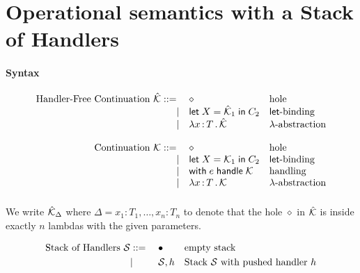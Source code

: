\documentclass{article}
\newcommand{\bnf}{\mathrel{{:}{:}{=}}}
\newcommand{\bnfor}{|}
\newcommand{\x}{x}     %
\newcommand{\C}{C}     %
\newcommand{\X}{X}     %
\newcommand{\e}{e}     %
\newcommand{\rgn}{r}   %
\newcommand{\h}{h}     %
\newcommand{\T}{T}     %
\newcommand{\letin}[1]{\mathsf{let}\; #1 \;\mathsf{in}\;} %
\newcommand{\withhandle}[1]{\mathsf{with}\;#1\;\mathsf{handle}\;} %
\newcommand{\abs}[1]{\mathsf{abs}\;#1\;\mathsf{in}\;} %
\newcommand{\lam}[2]{\lambda #1 \,{:}\, #2 \,.\,} %
\newcommand{\cont}{{\cal K}}     %
\newcommand{\hfcont}{\hat{\cal K}}     %
\newcommand{\hole}{\diamond}
\newcommand{\D}{\Delta}
\renewcommand{\S}{{\cal S}}
\newcommand{\emptystack}{\bullet}
\begin{document}
\section{Operational semantics with a Stack of Handlers}
\label{sec:oper-semant-stack}

\paragraph{Syntax}

\begin{equation*}
  \begin{array}{rll}
  \text{Handler-Free Continuation $\hfcont$}  \bnf   {} & \hole                & \text{hole} \\
    \bnfor {} & \letin{\X = \hfcont_1} \C_2  & \text{$\mathsf{let}$-binding} \\
    \bnfor {} & \lam{\x}{\T} \hfcont   & \text{$\lambda$-abstraction} \\
    \\
  \text{Continuation $\cont$}  \bnf   {} & \hole                & \text{hole} \\
    \bnfor {} & \letin{\X = \cont_1} \C_2  & \text{$\mathsf{let}$-binding} \\
    \bnfor {} & \withhandle{\e} \cont & \text{handling} \\
    \bnfor {} & \lam{\x}{\T} \cont   & \text{$\lambda$-abstraction} \\[10pt]
  \end{array}
\end{equation*}
%
We write $\hfcont_\D$ where $\D = {\x_1{:}\T_1,\ldots,x_n{:}T_n}$ to denote that the hole $\hole$ in $\hfcont$ is inside
exactly $n$ lambdas with the given parameters.

\begin{equation*}
  \text{Stack of Handlers $\S$}
  \begin{aligned}[t]
    &\bnf   {} && \emptystack                && \text{empty stack} \\
    &\bnfor {} && \S,\h                      && \text{Stack $\S$ with pushed handler $\h$} \\
  \end{aligned}
\end{equation*}
%
\end{document}
